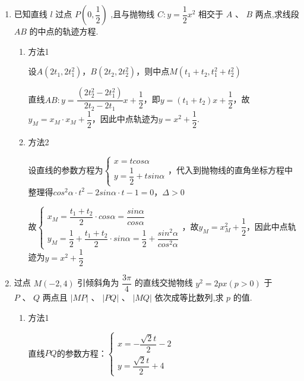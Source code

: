 \begin{enumerate}
    \item 已知直线 $l$ 过点 $P\left( {0,\dfrac{1}{2}}\right)$ ,且与抛物线 $C : y = \dfrac{1}{2}{x}^{2}$ 相交于 $A$ 、 $B$ 两点,求线段 ${AB}$ 的中点的轨迹方程.
    \begin{jieda}
        \begin{enumerate}
            \item 方法1
            
            设$A(2t_1, 2t_1^2)$，$B(2t_2, 2t_2^2)$，则中点$M(t_1+t_2, t_1^2+t_2^2)$
    
            直线$AB: y = \dfrac{(2t_2^2-2t_1^2)}{2t_2-2t_1}x+\dfrac{1}{2}$，即$y = (t_1+t_2)x+\dfrac{1}{2}$，故$y_M = x_M \cdot x_M + \dfrac{1}{2}$，因此中点轨迹为$y = x^2+\dfrac{1}{2}$.

            \item 方法2

            设直线的参数方程为$\left\{\begin{array}{l}
                 x = tcos\alpha \\
                 y = \dfrac{1}{2} + t sin\alpha
            \end{array}\right.$，代入到抛物线的直角坐标方程中整理得$cos^2\alpha \cdot t^2 - 2sin\alpha \cdot t - 1 = 0$，$\Delta > 0$

            故$\left\{\begin{array}{l}
                 x_M = \dfrac{t_1+t_2}{2} \cdot cos\alpha = \dfrac{sin\alpha}{cos\alpha} \\
                 y_M = \dfrac{1}{2} + \dfrac{t_1+t_2}{2} \cdot sin\alpha = \dfrac{1}{2} + \dfrac{sin^2\alpha}{cos^2\alpha}
            \end{array}\right.$，故$y_M = x_M^2+\dfrac{1}{2}$，因此中点轨迹为$y = x^2+\dfrac{1}{2}$
        \end{enumerate}
        
    \end{jieda}
    
    \item 过点 $M\left( {-2,4}\right)$ 引倾斜角为 $\dfrac{3\pi }{4}$ 的直线交抛物线 ${y}^{2} = {2px}\left( {p > 0}\right)$ 于 $P\text{ 、 }Q$ 两点且 $\left| {MP}\right| \text{ 、 }\left| {PQ}\right| \text{ 、 }\left| {MQ}\right|$ 依次成等比数列,求 $p$ 的值.
    \begin{jieda}
        \begin{enumerate}
            \item 方法1

            直线$PQ$的参数方程：$\left\{\begin{array}{l}
                 x = -\dfrac{\sqrt{2}t}{2} - 2 \\
                 y = \dfrac{\sqrt{2}t}{2} + 4
            \end{array}\right.$


\end{enumerate}
\end{jieda}
\end{enumerate}
